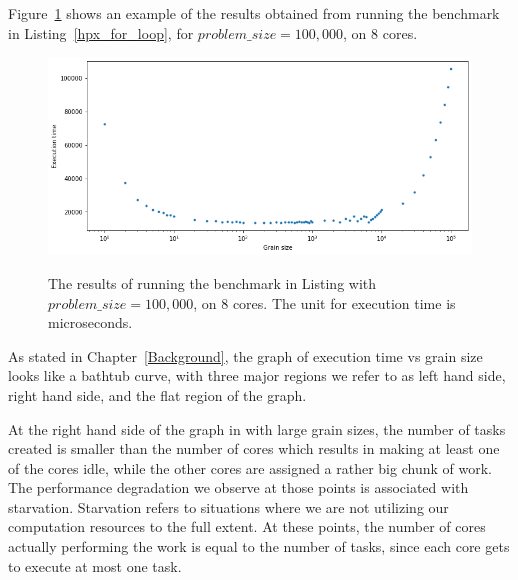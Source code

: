 
Figure~\ref{fig41} shows an example of the results obtained from running the benchmark in Listing~\ref{hpx_for_loop}, for $problem\_size=100,000$, on 8 cores.
\begin{figure}[H]
	\centering
	{\includegraphics[scale=.45]{images/hpx_for_loop/100000_8.png}}
	\caption{The results of running the benchmark in Listing with $problem\_size=100,000$, on 8 cores. The unit for execution time is microseconds.}\label{fig41}		
\end{figure}



As stated in Chapter~\ref{Background}, the graph of execution time vs grain size looks like a bathtub curve, with three major regions we refer to as left hand side, right hand side, and the flat region of the graph. 

At the right hand side of the graph in with large grain sizes, the number of tasks created is smaller than the number of cores which results in making at least one of the cores idle, while the other cores are assigned a rather big chunk of work. The performance degradation we observe at those points is associated with starvation. Starvation refers to situations where we are not utilizing our computation resources to the full extent. At these points, the number of cores actually performing the work is equal to the number of tasks, since each core gets to execute at most one task. 

